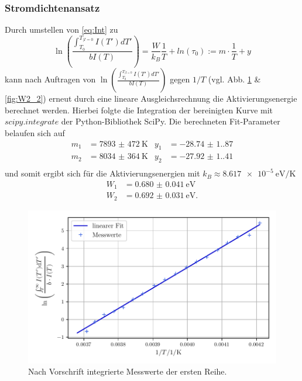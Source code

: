 \subsubsection{Stromdichtenansatz}
Durch umstellen von \autoref{eq:Int} zu 
\begin{equation*}
    \ln\left(\frac{\int_{T_0}^{T_{|I=0}} I(T')dT'}{b I(T)}\right) = \frac{W}{k_B}\frac{1}{T} + ln(\tau_0) := m\cdot\frac{1}{T} + y
\end{equation*}
kann nach Auftragen von $\ln\left(\frac{\int_{T_0}^{T_{|I=0}} I(T')dT'}{b I(T)}\right)$ gegen $1/T$ (vgl. Abb. \ref{fig:W2_1} \& \ref{fig:W2_2})
erneut durch eine lineare Ausgleichsrechnung die Aktivierungsenergie berechnet werden.
Hierbei folgte die Integration der bereinigten Kurve mit $scipy.integrate$ der Python-Bibliothek SciPy\cite{scipy}.
Die berechneten Fit-Parameter belaufen sich auf
\begin{align}
    m_1 &= \qty{7893(472)}{\kelvin} & y_1 &= \num{-28.74(1.87)} \\
    m_2 &= \qty{8034(364)}{\kelvin} & y_2 &= \num{-27.92(1.41)} \\
\end{align}
und somit ergibt sich für die Aktivierungsenergien mit $k_B \approx \qty{8,617e-5}{\electronvolt\per\kelvin}$
\begin{align}
    W_1 &= \qty{0.680(41)}{\electronvolt} \\
    W_2 &= \qty{0.692(31)}{\electronvolt}.
\end{align}
\begin{figure}
    \centering
    \includegraphics[width=0.8\linewidth]{scripts/build/plot1_2.pdf}
    \caption{Nach Vorschrift integrierte Messwerte der ersten Reihe.}
    \label{fig:W2_1}
\end{figure}
